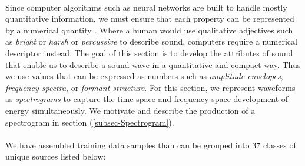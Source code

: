 \documentclass[12pt,letterpaper]{article}
\begin{document}
\paragraph*{}Since computer algorithms such as neural networks are built to handle mostly quantitative information, we must ensure that each property can be represented by a numerical quantity \cite{Geron,Levine}. Where a human would use qualitative adjectives such as \textit{bright} or \textit{harsh} or \textit{percussive} to describe sound, computers require a numerical descriptor instead. The goal of this section is to develop the attributes of sound that enable us to describe a sound wave in a quantitative and compact way. Thus we use values that can be expressed as numbers such as \textit{amplitude envelopes}, \textit{frequency spectra}, or \textit{formant structure}. For this section, we represent waveforms as \textit{spectrograms} to capture the time-space and frequency-space development of energy simultaneously. We motivate and describe the production of a spectrogram in section (\ref{subsec-Spectrogram}).

\paragraph*{}We have assembled training data samples than can be grouped into $37$ classes of unique sources listed below:
\end{document}

